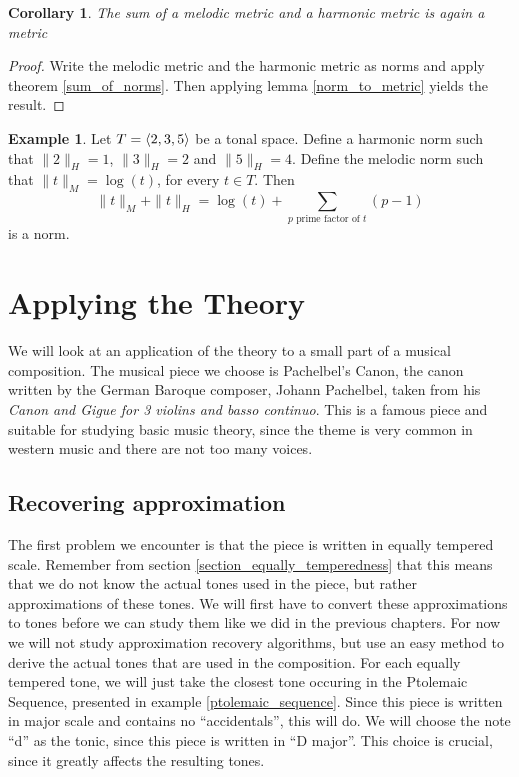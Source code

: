 \documentclass[a4paper]{book}
\newtheorem{corollary}[theorem]{Corollary}
\theoremstyle{definition}
\newtheorem{example}[theorem]{Example}
\begin{document}
\begin{corollary}
    The sum of a melodic metric and a harmonic metric is again a metric
    \label{sum_of_metrics}
\end{corollary}
\begin{proof}
    Write the melodic metric and the harmonic metric as norms and apply theorem \ref{sum_of_norms}.
    Then applying lemma \ref{norm_to_metric} yields the result.
\end{proof}

\begin{example}
    Let $T = \langle 2,3,5 \rangle$ be a tonal space.
    Define a harmonic norm such that $\|2\|_H = 1$, $\|3\|_H = 2$ and $\|5\|_H = 4$.
    Define the melodic norm such that $\|t\|_M = \log(t)$, for every $t\in T$.
    Then \[\|t\|_M + \|t\|_H = \log(t) + \sum_{p \text{ prime factor of } t}{(p-1)}\] is a norm.
\end{example}

\chapter{Applying the Theory}
\label{application}
We will look at an application of the theory to a small part of a musical composition.
The musical piece we choose is Pachelbel's Canon, the canon written by the German Baroque composer, Johann Pachelbel, taken from his \emph{Canon and Gigue for 3 violins and basso continuo}.
This is a famous piece and suitable for studying basic music theory, since the theme is very common in western music and there are not too many voices.

\section{Recovering approximation}
The first problem we encounter is that the piece is written in equally tempered scale.
Remember from section \ref{section_equally_temperedness} that this means that we do not know the actual tones used in the piece, but rather approximations of these tones.
We will first have to convert these approximations to tones before we can study them like we did in the previous chapters.
For now we will not study approximation recovery algorithms, but use an easy method to derive the actual tones that are used in the composition.
For each equally tempered tone, we will just take the closest tone occuring in the Ptolemaic Sequence, presented in example \ref{ptolemaic_sequence}.
Since this piece is written in major scale and contains no ``accidentals'', this will do.
We will choose the note ``d'' as the tonic, since this piece is written in ``D major''.
This choice is crucial, since it greatly affects the resulting tones.
\end{document}
